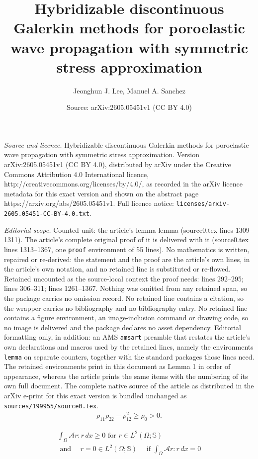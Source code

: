 \documentclass[10pt,a4paper]{amsart}
\title{Hybridizable discontinuous Galerkin methods for poroelastic wave propagation with symmetric stress approximation}
\author{Jeonghun J. Lee, Manuel A. Sanchez}
\date{Source: arXiv:2605.05451v1 (CC BY 4.0)}
\newcommand{\Ael}{\mathcal{A}} %
\begin{document}
\maketitle

\noindent\emph{Source and licence.} Hybridizable discontinuous Galerkin methods for poroelastic wave propagation with symmetric stress approximation. Version arXiv:2605.05451v1 (CC BY 4.0), distributed by arXiv under the Creative Commons Attribution 4.0 International licence, http://creativecommons.org/licenses/by/4.0/, as recorded in the arXiv licence metadata for this exact version and shown on the abstract page https://arxiv.org/abs/2605.05451v1. Full licence notice: \texttt{licenses/arxiv-2605.05451-CC-BY-4.0.txt}.\par\smallskip

\noindent\textit{Editorial scope.} Counted unit: the article's lemma lemma (source0.tex lines 1309--1311). The article's complete original proof of it is delivered with it (source0.tex lines 1313--1367, one \texttt{proof} environment of 55 lines). No mathematics is written, repaired or re-derived: the statement and the proof are the article's own lines, in the article's own notation, and no retained line is substituted or re-flowed.  Retained uncounted as the source-local context the proof needs: lines 292--295; lines 306--311; lines 1261--1367.  Nothing was omitted from any retained span, so the package carries no omission record.  No retained line contains a citation, so the wrapper carries no bibliography and no bibliography entry.  No retained line contains a figure environment, an image-inclusion command or drawing code, so no image is delivered and the package declares no asset dependency.  Editorial formatting only, in addition: an AMS \texttt{amsart} preamble that restates the article's own declarations and macros used by the retained lines, namely the environments \texttt{lemma} on separate counters, together with the standard packages those lines need.  The retained environments print in this document as Lemma 1 in order of appearance, whereas the article prints the same items with the numbering of its own full document.  The complete native source of the article as distributed in the arXiv e-print for this exact version is bundled unchanged as \texttt{sources/199955/source0.tex}.
\begin{align}
	\label{eq:rho-coercivity}
	\rho_{11}\rho_{22}-\rho_{12}^2 \ge \rho_0 >0.
\end{align}

\begin{multline}
	\label{eq:A-positive}
	\int_{\Omega} \Ael r : r \,dx \ge 0 \text{ for } r \in L^2(\Omega; \mathbb{S}) 
    \\
    \text{ and } \quad r = 0 \in L^2(\Omega; \mathbb{S}) \quad \text{ if } \int_{\Omega} \Ael r : r \,dx = 0 
\end{multline}
\end{document}
